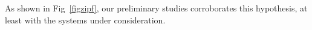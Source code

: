 \documentclass[onecolumn, compsoc,11pt]{IEEEtran}
\begin{document}
As shown in Fig~\ref{figzipf}, our preliminary studies corroborates this hypothesis, at least with the systems under consideration.



\end{document}

